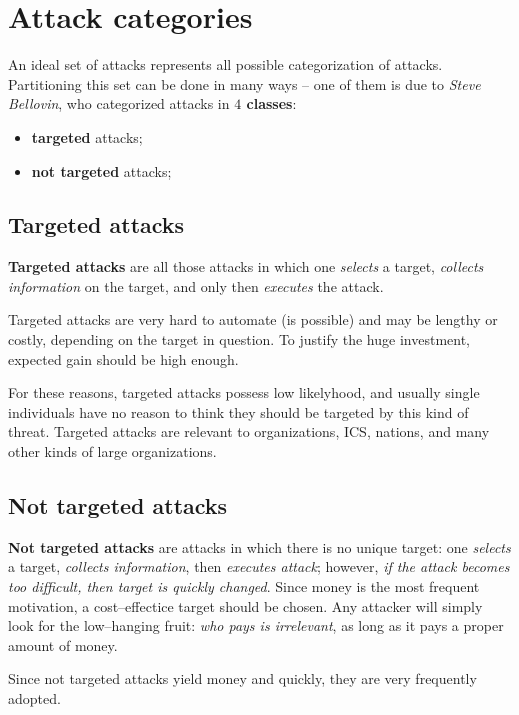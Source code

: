 \documentclass[10pt]{extbook}
\begin{document}
\section{Attack categories}

An ideal set of attacks represents all possible categorization of attacks.
Partitioning this set can be done in many ways -- one of them is due to
\emph{Steve Bellovin}, who categorized attacks in \textbf{$4$ classes}:
\begin{itemize}
    \item \textbf{targeted} attacks;
    \item \textbf{not targeted} attacks;
\end{itemize}

\subsection{Targeted attacks}

\textbf{Targeted attacks} are all those attacks in which one \emph{selects} a
target, \emph{collects information} on the target, and only then
\emph{executes} the attack.

Targeted attacks are very hard to automate (is possible) and may be lengthy or
costly, depending on the target in question. To justify the huge investment,
expected gain should be high enough.

For these reasons, targeted attacks possess low likelyhood, and usually single
individuals have no reason to think they should be targeted by this kind of
threat. Targeted attacks are relevant to organizations, ICS, nations, and many
other kinds of large organizations.

\subsection{Not targeted attacks}

\textbf{Not targeted attacks} are attacks in which there is no unique target:
one \emph{selects} a target, \emph{collects information}, then \emph{executes
attack}; however, \emph{if the attack becomes too difficult, then target is
quickly changed}. Since money is the most frequent motivation, a
cost--effectice target should be chosen. Any attacker will simply look for the
low--hanging fruit: \emph{who pays is irrelevant}, as long as it pays a proper
amount of money.

Since not targeted attacks yield money and quickly, they are very frequently
adopted.
\end{document}
